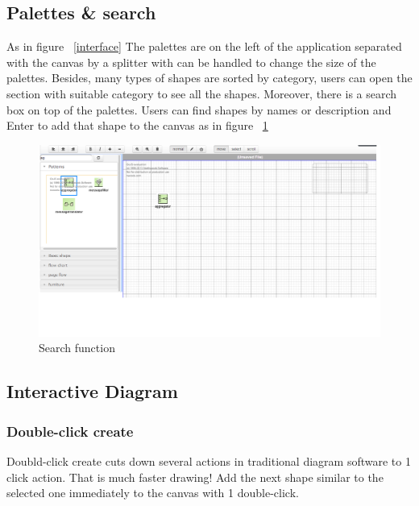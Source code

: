 \documentclass[14pt,a4paper]{extreport}
\begin{document}
		\subsection{Palettes \& search}
		As in figure ~\ref{interface} The palettes are on the left of the application separated with the canvas by a splitter with can be handled to change the size of the palettes. Besides, many types of shapes are sorted by category, users can open the section with suitable category to see all the shapes. Moreover, there is a search box on top of the palettes. Users can find shapes by names or description and Enter to add that shape to the canvas as in figure ~\ref{search}
		\begin{figure}[ht]
				\begin{center}
					\includegraphics[scale=0.5]{search.png}
					\caption{Search function}
					\label{search}
				\end{center}
			\end{figure}
		
			
		\subsection{Interactive Diagram}
			\subsubsection{Double-click create}
				Doubld-click create cuts down several actions in traditional diagram software to 1 click action. That is much faster drawing! Add the next shape similar to the selected one immediately to the canvas with 1 double-click.
\end{document}
